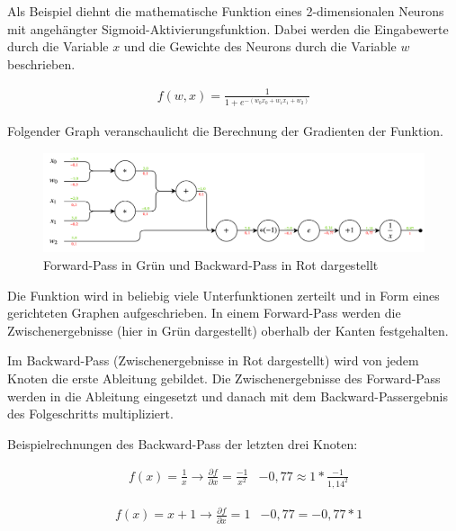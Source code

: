 Als Beispiel diehnt die mathematische Funktion eines 2-dimensionalen Neurons mit angehängter Sigmoid-Aktivierungsfunktion. Dabei werden die Eingabewerte durch die Variable $ x $ und die Gewichte des Neurons durch die Variable $ w $ beschrieben.

\begin{align}
	f(w, x) = \frac{1}{ 1 + e^{ - (w_{0}x_{0} + w_{1}x_{1} + w_{2}) } }
\end{align}

\pagebreak

Folgender Graph veranschaulicht die Berechnung der Gradienten der Funktion.

\begin{figure}[H]
	\centering
	\includegraphics[width=1\textwidth]{resources/content/backpropagation.png}
	\caption{Forward-Pass in Grün und Backward-Pass in Rot dargestellt \cite{cs231n2}}
	\label{img:backpropagation_img}
\end{figure}

Die Funktion wird in beliebig viele Unterfunktionen zerteilt und in Form eines gerichteten Graphen aufgeschrieben.
In einem Forward-Pass werden die Zwischenergebnisse (hier in Grün dargestellt) oberhalb der Kanten festgehalten.

Im Backward-Pass (Zwischenergebnisse in Rot dargestellt) wird von jedem Knoten die erste Ableitung gebildet. Die Zwischenergebnisse des Forward-Pass werden in die Ableitung eingesetzt und danach mit dem Backward-Passergebnis des Folgeschritts multipliziert.

Beispielrechnungen des Backward-Pass der letzten drei Knoten: 

\begin{align}
	& f(x) = \frac{1}{x} \rightarrow \frac{\partial f}{\partial x} = \frac{-1}{ x^{2} }
	& -0,77 \approx 1 * \frac{-1}{ 1,14^{2} }
\end{align}

\begin{align}
	& f(x) = x + 1 \rightarrow \frac{\partial f}{\partial x} = 1
	& -0,77 = -0,77 * 1
\end{align}

